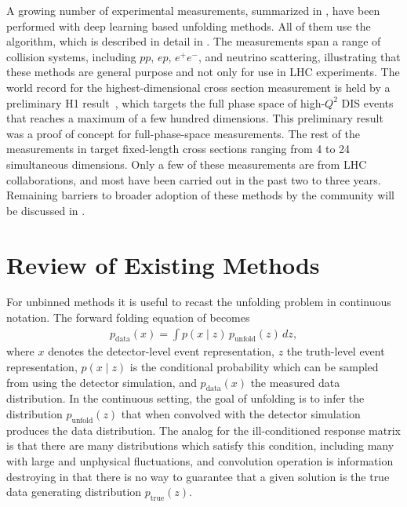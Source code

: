 

A growing number of experimental measurements, summarized in , have been performed with deep learning based unfolding methods.
All of them use the \Omnifold algorithm, which is described in detail in .
The measurements span a range of collision systems, including $pp$, $ep$, $e^+e^-$, and neutrino scattering, illustrating that these methods are general purpose and not only for use in LHC experiments.
The world record for the highest-dimensional cross section measurement is held by a preliminary H1 result~\cite{H1:prelim}, which targets the full phase space of high-$Q^2$ DIS events that reaches a maximum of a few hundred dimensions.
This preliminary result was a proof of concept for full-phase-space measurements.
The rest of the measurements in  target fixed-length cross sections ranging from 4 to 24 simultaneous dimensions.
Only a few of these measurements are from LHC collaborations, and most have been carried out in the past two to three years.
Remaining barriers to broader adoption of these methods by the community will be discussed in .

\section{Review of Existing Methods}
\label{sec:unfolding-methods}

For unbinned methods it is useful to recast the unfolding problem in continuous notation.
The forward folding equation of  becomes
\begin{align}
\label{eq:folding-continuous}
p_{\mathrm{data}}(x) = \int p(x \mid z)\, p_{\mathrm{unfold}}(z)\, dz,
\end{align}
where $x$ denotes the detector-level event representation, $z$ the truth-level event representation, $p(x \mid z)$ is the conditional probability which can be sampled from using the detector simulation, and $p_{\mathrm{data}}(x)$ the measured data distribution.
In the continuous setting, the goal of unfolding is to infer the distribution $p_{\mathrm{unfold}}(z)$ that when convolved with the detector simulation produces the data distribution.
The analog for the ill-conditioned response matrix is that there are many distributions which satisfy this condition, including many with large and unphysical fluctuations, and convolution operation is information destroying in that there is no way to guarantee that a given solution is the true data generating distribution $p_{\mathrm{true}}(z)$.


